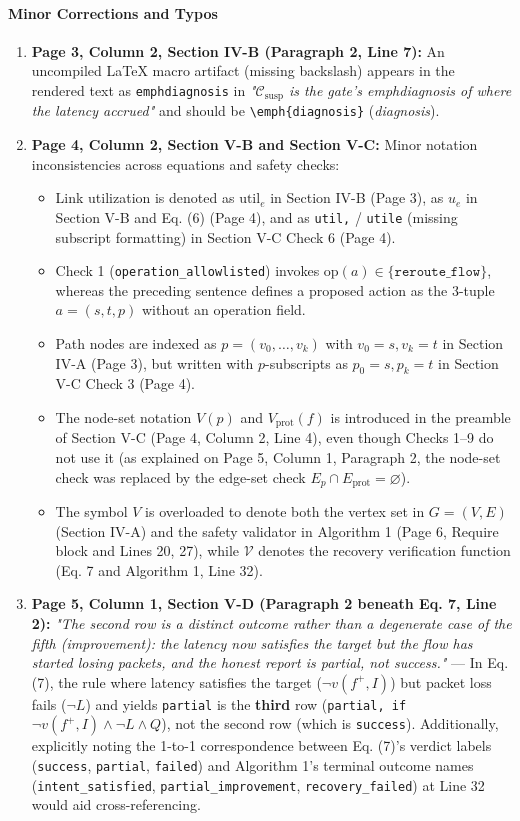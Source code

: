 \documentclass[11pt,a4paper]{article}
\begin{document}
\paragraph{Minor Corrections and Typos}
\begin{enumerate}[leftmargin=1.6em,itemsep=3pt]
\item \textbf{Page 3, Column 2, Section IV-B (Paragraph 2, Line 7):} An uncompiled LaTeX macro artifact (missing backslash) appears in the rendered text as \texttt{emphdiagnosis} in \emph{"$\mathcal{C}_{\text{susp}}$ is the gate's emphdiagnosis of where the latency accrued"} and should be \texttt{\textbackslash{}emph\{diagnosis\}} (\emph{diagnosis}).
\item \textbf{Page 4, Column 2, Section V-B and Section V-C:} Minor notation inconsistencies across equations and safety checks:
\begin{itemize}[leftmargin=1.8em,itemsep=2pt]
\item Link utilization is denoted as $\text{util}_e$ in Section IV-B (Page 3), as $u_e$ in Section V-B and Eq. (6) (Page 4), and as \texttt{util,} / \texttt{utile} (missing subscript formatting) in Section V-C Check 6 (Page 4).
\item Check 1 (\texttt{operation\_allowlisted}) invokes $\text{op}(a) \in \{\texttt{reroute\_flow}\}$, whereas the preceding sentence defines a proposed action as the 3-tuple $a = (s, t, p)$ without an operation field.
\item Path nodes are indexed as $p = (v_0, \dots, v_k)$ with $v_0 = s, v_k = t$ in Section IV-A (Page 3), but written with $p$-subscripts as $p_0 = s, p_k = t$ in Section V-C Check 3 (Page 4).
\item The node-set notation $V(p)$ and $V_{\text{prot}}(f)$ is introduced in the preamble of Section V-C (Page 4, Column 2, Line 4), even though Checks 1–9 do not use it (as explained on Page 5, Column 1, Paragraph 2, the node-set check was replaced by the edge-set check $E_p \cap E_{\text{prot}} = \varnothing$).
\item The symbol $V$ is overloaded to denote both the vertex set in $G = (V, E)$ (Section IV-A) and the safety validator in Algorithm 1 (Page 6, Require block and Lines 20, 27), while $\mathcal{V}$ denotes the recovery verification function (Eq. 7 and Algorithm 1, Line 32).
\end{itemize}
\item \textbf{Page 5, Column 1, Section V-D (Paragraph 2 beneath Eq. 7, Line 2):} \emph{"The second row is a distinct outcome rather than a degenerate case of the fifth (improvement): the latency now satisfies the target but the flow has started losing packets, and the honest report is partial, not success."} — In Eq. (7), the rule where latency satisfies the target ($\neg v(f^+, I)$) but packet loss fails ($\neg L$) and yields \texttt{partial} is the \textbf{third} row (\texttt{partial, if} $\neg v(f^+, I) \wedge \neg L \wedge Q$), not the second row (which is \texttt{success}). Additionally, explicitly noting the 1-to-1 correspondence between Eq. (7)'s verdict labels (\texttt{success}, \texttt{partial}, \texttt{failed}) and Algorithm 1's terminal outcome names (\texttt{intent\_satisfied}, \texttt{partial\_improvement}, \texttt{recovery\_failed}) at Line 32 would aid cross-referencing.

\end{enumerate}
\end{document}
